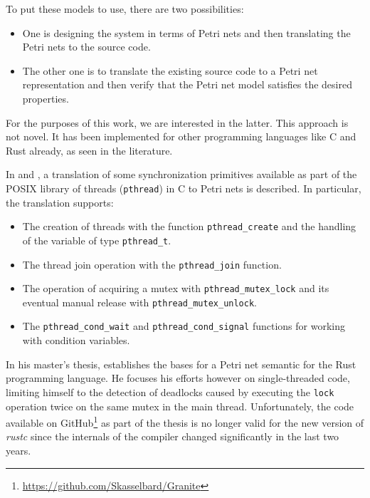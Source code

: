 \documentclass[../Thesis.tex]{subfiles}
\begin{document}
To put these models to use, there are two possibilities:

\begin{itemize}
      \item One is designing the system in terms of Petri nets
            and then translating the Petri nets to the source code.
      \item The other one is to translate the existing source code to a Petri net representation
            and then verify that the Petri net model satisfies the desired properties.
\end{itemize}

For the purposes of this work, we are interested in the latter.
This approach is not novel.
It has been implemented for other programming languages like C and Rust already,
as seen in the literature.

In \cite{kavi2002modeling} and \cite{moshtaghi2001},
a translation of some synchronization primitives available as part of
the POSIX library of threads (\texttt{pthread}) in C to Petri nets is described.
In particular, the translation supports:

\begin{itemize}
      \item The creation of threads with the function \texttt{pthread\_create}
            and the handling of the variable of type \texttt{pthread\_t}.
      \item The thread join operation with the \texttt{pthread\_join} function.
      \item The operation of acquiring a mutex with \texttt{pthread\_mutex\_lock}
            and its eventual manual release with \texttt{pthread\_mutex\_unlock}.
      \item The \texttt{pthread\_cond\_wait} and \texttt{pthread\_cond\_signal} functions
            for working with condition variables.
\end{itemize}

In his master's thesis, \cite{meyer2020} establishes
the bases for a Petri net semantic for the Rust programming language.
He focuses his efforts however on single-threaded code,
limiting himself to the detection of deadlocks caused by
executing the \texttt{lock} operation twice on the same mutex in the main thread.
Unfortunately, the code available on GitHub\footnote{\url{https://github.com/Skasselbard/Granite}}
as part of the thesis is no longer valid for the new version of \emph{rustc}
since the internals of the compiler changed significantly in the last two years.
\end{document}
